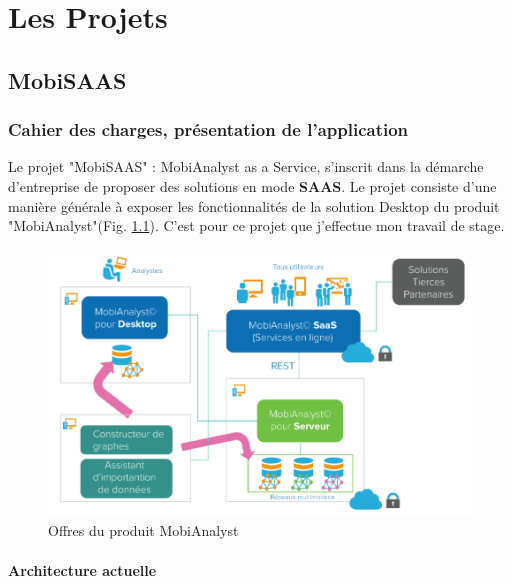 \chapter{Les Projets}
\label{Developpement}

\section{MobiSAAS}

\subsection{Cahier des charges, présentation de l'application}

Le projet "MobiSAAS" : MobiAnalyst as a Service, s'inscrit dans la démarche d'entreprise de proposer des solutions en mode \textbf{SAAS}. Le projet consiste d'une manière générale à exposer les fonctionnalités de la solution Desktop du produit "MobiAnalyst"(Fig. \ref{OffreMobiAnalyst}). C'est pour ce projet que j'effectue mon travail de stage.\\

\begin{figure}[!h]
\centering
\includegraphics[width=14cm]{images/offre_MobiAnalyst.png}
\caption{\label{OffreMobiAnalyst}Offres du produit MobiAnalyst}
\end{figure} 

\subsubsection{Architecture actuelle}

